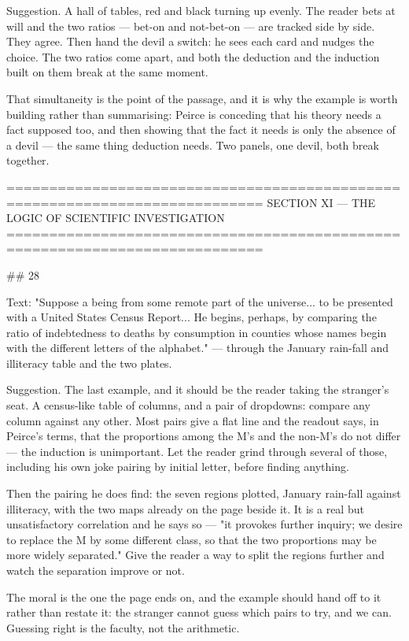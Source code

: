 Suggestion. A hall of tables, red and black turning up evenly. The reader bets
at will and the two ratios — bet-on and not-bet-on — are tracked side by side.
They agree. Then hand the devil a switch: he sees each card and nudges the
choice. The two ratios come apart, and both the deduction and the induction
built on them break at the same moment.

That simultaneity is the point of the passage, and it is why the example is
worth building rather than summarising: Peirce is conceding that his theory
needs a fact supposed too, and then showing that the fact it needs is only the
absence of a devil — the same thing deduction needs. Two panels, one devil, both
break together.


============================================================================
SECTION XI — THE LOGIC OF SCIENTIFIC INVESTIGATION
============================================================================

## 28

Text: "Suppose a being from some remote part of the universe... to be presented
with a United States Census Report... He begins, perhaps, by comparing the ratio
of indebtedness to deaths by consumption in counties whose names begin with the
different letters of the alphabet." — through the January rain-fall and
illiteracy table and the two plates.

Suggestion. The last example, and it should be the reader taking the stranger's
seat. A census-like table of columns, and a pair of dropdowns: compare any
column against any other. Most pairs give a flat line and the readout says, in
Peirce's terms, that the proportions among the M's and the non-M's do not
differ — the induction is unimportant. Let the reader grind through several of
those, including his own joke pairing by initial letter, before finding
anything.

Then the pairing he does find: the seven regions plotted, January rain-fall
against illiteracy, with the two maps already on the page beside it. It is a
real but unsatisfactory correlation and he says so — "it provokes further
inquiry; we desire to replace the M by some different class, so that the two
proportions may be more widely separated." Give the reader a way to split the
regions further and watch the separation improve or not.

The moral is the one the page ends on, and the example should hand off to it
rather than restate it: the stranger cannot guess which pairs to try, and we
can. Guessing right is the faculty, not the arithmetic.


